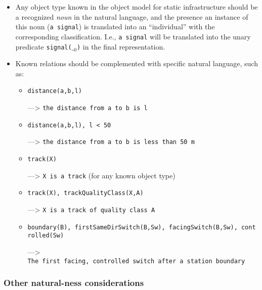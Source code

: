 \documentclass[]{article}
\begin{document}
\begin{itemize}
\item
  Any object type known in the object model for static infrastructure
  should be a recognized \emph{noun} in the natural language, and the
  presence an instance of this noun (\texttt{a\ signal}) is translated
  into an ``individual'' with the corresponding classification. I.e.,
  \texttt{a\ signal} will be translated into the unary predicate
  \texttt{signal(}\(\__0\)\texttt{)} in the final representation.
\item
  Known relations should be complemented with specific natural language,
  such as:

  \begin{itemize}
  \item
    \texttt{distance(a,b,l)}

    ---\textgreater{} \texttt{the\ distance\ from\ a\ to\ b\ is\ l}
  \item
    \texttt{distance(a,b,l),\ l\ \textless{}\ 50}

    ---\textgreater{}
    \texttt{the\ distance\ from\ a\ to\ b\ is\ less\ than\ 50\ m}
  \item
    \texttt{track(X)}

    ---\textgreater{} \texttt{X\ is\ a\ track} (for any known object
    type)
  \item
    \texttt{track(X),\ trackQualityClass(X,A)}

    ---\textgreater{} \texttt{X\ is\ a\ track\ of\ quality\ class\ A}
  \item
    \texttt{boundary(B),\ firstSameDirSwitch(B,Sw),\ facingSwitch(B,Sw),\ controlled(Sw)}

    ---\textgreater{}
    \texttt{The\ first\ facing,\ controlled\ switch\ after\ a\ station\ boundary}
  \end{itemize}
\end{itemize}

\subsubsection{Other natural-ness
considerations}\label{other-natural-ness-considerations}
\end{document}
